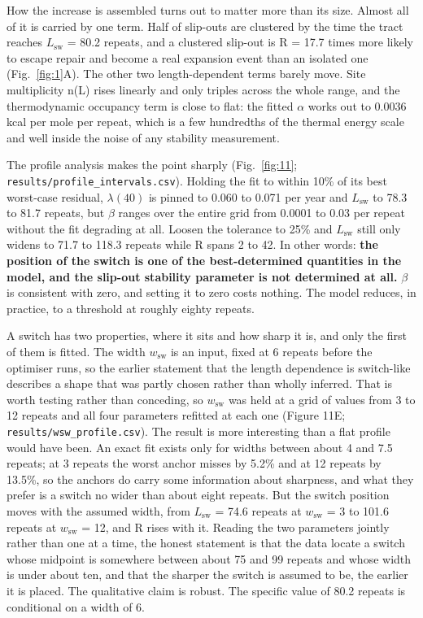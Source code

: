 \documentclass[conference]{IEEEtran}
\begin{document}
How the increase is assembled turns out to matter more than its size. Almost all of it is carried by one term. Half of slip-outs are clustered by the time the tract reaches $L_{\mathrm{sw}}$ = 80.2 repeats, and a clustered slip-out is R = 17.7 times more likely to escape repair and become a real expansion event than an isolated one (Fig.~\ref{fig:1}A). The other two length-dependent terms barely move. Site multiplicity n(L) rises linearly and only triples across the whole range, and the thermodynamic occupancy term is close to flat: the fitted $\alpha$ works out to 0.0036 kcal per mole per repeat, which is a few hundredths of the thermal energy scale and well inside the noise of any stability measurement.

The profile analysis makes the point sharply (Fig.~\ref{fig:11}; \texttt{results/\allowbreak{}profile\_\allowbreak{}intervals.\allowbreak{}csv}). Holding the fit to within 10\% of its best worst-case residual, $\lambda(40)$ is pinned to 0.060 to 0.071 per year and $L_{\mathrm{sw}}$ to 78.3 to 81.7 repeats, but $\beta$ ranges over the entire grid from 0.0001 to 0.03 per repeat without the fit degrading at all. Loosen the tolerance to 25\% and $L_{\mathrm{sw}}$ still only widens to 71.7 to 118.3 repeats while R spans 2 to 42. In other words: \textbf{the position of the switch is one of the best-determined quantities in the model, and the slip-out stability parameter is not determined at all.} $\beta$ is consistent with zero, and setting it to zero costs nothing. The model reduces, in practice, to a threshold at roughly eighty repeats.

A switch has two properties, where it sits and how sharp it is, and only the first of them is fitted. The width $w_{\mathrm{sw}}$ is an input, fixed at 6 repeats before the optimiser runs, so the earlier statement that the length dependence is switch-like describes a shape that was partly chosen rather than wholly inferred. That is worth testing rather than conceding, so $w_{\mathrm{sw}}$ was held at a grid of values from 3 to 12 repeats and all four parameters refitted at each one (Figure 11E; \texttt{results/\allowbreak{}wsw\_\allowbreak{}profile.\allowbreak{}csv}). The result is more interesting than a flat profile would have been. An exact fit exists only for widths between about 4 and 7.5 repeats; at 3 repeats the worst anchor misses by 5.2\% and at 12 repeats by 13.5\%, so the anchors do carry some information about sharpness, and what they prefer is a switch no wider than about eight repeats. But the switch position moves with the assumed width, from $L_{\mathrm{sw}}$ = 74.6 repeats at $w_{\mathrm{sw}}$ = 3 to 101.6 repeats at $w_{\mathrm{sw}}$ = 12, and R rises with it. Reading the two parameters jointly rather than one at a time, the honest statement is that the data locate a switch whose midpoint is somewhere between about 75 and 99 repeats and whose width is under about ten, and that the sharper the switch is assumed to be, the earlier it is placed. The qualitative claim is robust. The specific value of 80.2 repeats is conditional on a width of 6.
\end{document}
